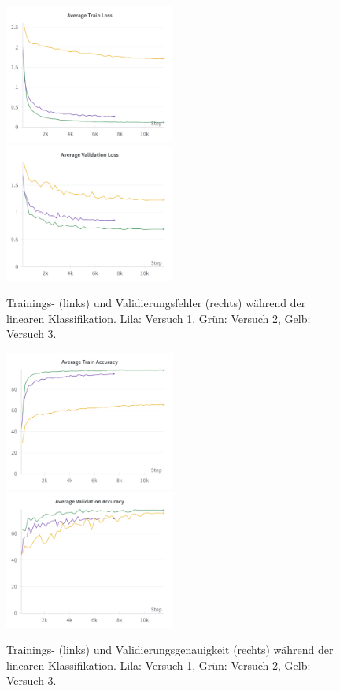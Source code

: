 \begin{figure}[]
	\centering
	\includegraphics[width=0.5\textwidth]{figure_results_supcon-lin_avg-train-loss.png}%
	\includegraphics[width=0.5\textwidth]{figure_results_supcon-lin_avg-val-loss.png}
	\caption{Trainings- (links) und Validierungsfehler (rechts) während der linearen Klassifikation. \textcolor{exp1}{Lila}: Versuch 1, \textcolor{exp2}{Grün}: Versuch 2, \textcolor{exp3}{Gelb}: Versuch 3.}
	\label{fig:supcon-lin-loss}
\end{figure}
\begin{figure}[]
	\centering
	\includegraphics[width=0.5\textwidth]{figure_results_supcon-lin_avg-train-acc.png}%
	\includegraphics[width=0.5\textwidth]{figure_results_supcon-lin_avg-val-acc.png}
	\caption{Trainings- (links) und Validierungsgenauigkeit (rechts) während der linearen Klassifikation. \textcolor{exp1}{Lila}: Versuch 1, \textcolor{exp2}{Grün}: Versuch 2, \textcolor{exp3}{Gelb}: Versuch 3.}
	\label{fig:supcon-lin-acc}
\end{figure}

